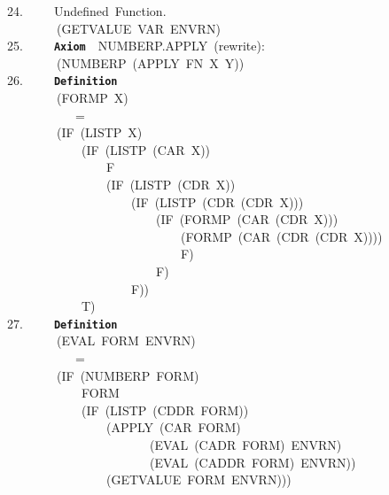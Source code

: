 \documentclass[11pt]{book}
\newenvironment{pubasis}{\begin{flushleft}\ttfamily\small}{\normalsize\rmfamily\end{flushleft}}
\newcommand{\axiomordefinition}[1]{\vspace{6pt}\texttt{\textbf{#1}}}
\begin{document}
\begin{pubasis}
24.~~~~~Undefined~Function.\\
~~~~~~~~(GETVALUE~VAR~ENVRN)\\

25.~~~~~\axiomordefinition{Axiom}~~NUMBERP.APPLY~(rewrite):\\
~~~~~~~~(NUMBERP~(APPLY~FN~X~Y))\\

26.~~~~~\axiomordefinition{Definition}\\
~~~~~~~~(FORMP~X)\\
~~~~~~~~~~~=\\
~~~~~~~~(IF~(LISTP~X)\\
~~~~~~~~~~~~(IF~(LISTP~(CAR~X))\\
~~~~~~~~~~~~~~~~F\\
~~~~~~~~~~~~~~~~(IF~(LISTP~(CDR~X))\\
~~~~~~~~~~~~~~~~~~~~(IF~(LISTP~(CDR~(CDR~X)))\\
~~~~~~~~~~~~~~~~~~~~~~~~(IF~(FORMP~(CAR~(CDR~X)))\\
~~~~~~~~~~~~~~~~~~~~~~~~~~~~(FORMP~(CAR~(CDR~(CDR~X))))\\
~~~~~~~~~~~~~~~~~~~~~~~~~~~~F)\\
~~~~~~~~~~~~~~~~~~~~~~~~F)\\
~~~~~~~~~~~~~~~~~~~~F))\\
~~~~~~~~~~~~T)\\

27.~~~~~\axiomordefinition{Definition}\\
~~~~~~~~(EVAL~FORM~ENVRN)\\
~~~~~~~~~~~=\\
~~~~~~~~(IF~(NUMBERP~FORM)\\
~~~~~~~~~~~~FORM\\
~~~~~~~~~~~~(IF~(LISTP~(CDDR~FORM))\\
~~~~~~~~~~~~~~~~(APPLY~(CAR~FORM)\\
~~~~~~~~~~~~~~~~~~~~~~~(EVAL~(CADR~FORM)~ENVRN)\\
~~~~~~~~~~~~~~~~~~~~~~~(EVAL~(CADDR~FORM)~ENVRN))\\
~~~~~~~~~~~~~~~~(GETVALUE~FORM~ENVRN)))\\


\end{pubasis}
\end{document}
